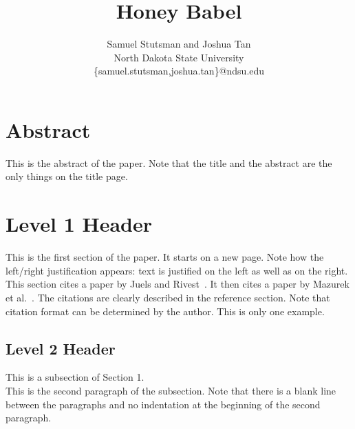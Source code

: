 \documentclass[12pt]{article}
\begin{document}
\pagestyle{plain}

\title{Honey Babel}

\author{
Samuel Stutsman and Joshua Tan\\
North Dakota State University\\
\{samuel.stutsman,joshua.tan\}@ndsu.edu
}
\date{} 

\maketitle
\thispagestyle{empty}

\section*{\centering Abstract}

This is the abstract of the paper. Note that the title and the abstract are the only things on the title page.

\newpage
\setcounter{page}{1}

\section{Level 1 Header}

This is the first section of the paper. It starts on a new page. Note how the left/right justification appears: text is justified on the left as well as on the right.  This section cites a paper by Juels and Rivest~\cite{Juels:2013:HMP:2508859.2516671}. It then cites a paper by Mazurek et al.~\cite{Mazurek:2013:MPG:2508859.2516726}. The citations are clearly described in the reference section. Note that citation format can be determined by the author. This is only one example.

\subsection{Level 2 Header}

This is a subsection of Section 1.\\  %

This is the second paragraph of the subsection.  Note that there is a blank line between the paragraphs and
no indentation at the beginning of the second paragraph. 
 
\end{document}
